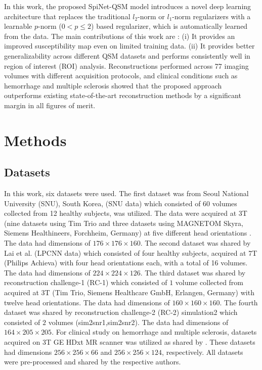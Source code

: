 \documentclass[sn-vancouver,Numbered]{sn-jnl}%
\begin{document}
 In this work, the proposed SpiNet-QSM model introduces a novel deep learning architecture that replaces the traditional $l_2$-norm or $l_1$-norm regularizers with a learnable $p$-norm ($0<p\leq2$) based regularizer, which is automatically learned from the data. The main contributions of this work are : (i) It provides an improved susceptibility map even on limited training data. (ii) It provides better generalizability across different QSM datasets and performs consistently well in region of interest (ROI) analysis. Reconstructions performed across 77 imaging volumes with different acquisition protocols, and clinical conditions such as hemorrhage and multiple sclerosis showed that the proposed approach outperforms existing state-of-the-art reconstruction methods by a significant margin in all figures of merit.
 
\section{Methods}\label{sec2}

\subsection{Datasets}\label{sec2sub1}
In this work, six datasets were used. The first dataset was from Seoul National University (SNU), South Korea, (SNU data) which consisted of $60$ volumes collected from 12 healthy subjects, was utilized. The data were acquired at 3T (nine datasets using Tim Trio and three datasets using MAGNETOM Skyra, Siemens Healthineers, Forchheim, Germany) at five different head orientations \cite{qsm_net}. The data had dimensions of $176 \times 176 \times 160$. The second dataset was shared by Lai et al. \cite{lai2020learned} (LPCNN data) which consisted of four healthy subjects, acquired at 7T (Philips Achieva) with four head orientations each, with a total of 16 volumes. The data had dimensions of $224 \times 224 \times 126$. The third dataset was shared by reconstruction challenge-1 (RC-1) \cite{langkammer2018quantitative} which consisted of $1$ volume collected from acquired at 3T (Tim Trio, Siemens Healthcare GmbH, Erlangen, Germany) with twelve head orientations. The data had dimensions of $160 \times 160 \times 160$. The fourth dataset was shared by reconstruction challenge-2 (RC-2) \cite{marques2021qsm} simulation2 which consisted of $2$ volumes (sim2snr1,sim2snr2). The data had dimensions of $ 164\times205  \times205 $. For clinical study on hemorrhage and multiple sclerosis, datasets acquired on 3T GE HDxt MR scanner was utilized as shared by \cite{modl_qsm}. These datasets had dimensions $256 \times 256 \times 66$ and $256 \times 256 \times 124$, respectively. All datasets were pre-processed and shared by the respective authors. 
\end{document}
